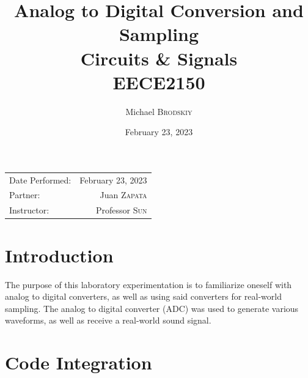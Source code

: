 \documentclass[
	letterpaper, %
	10pt, %
]{CSUniSchoolLabReport}
\title{Analog to Digital Conversion and Sampling \\ Circuits \& Signals \\ EECE2150} %
\author{Michael \textsc{Brodskiy}}
\date{February 23, 2023} %
\begin{document}
\maketitle %

\begin{center}
	\begin{tabular}{l r}
		Date Performed: & February 23, 2023 \\ %
        Partner: & Juan \textsc{Zapata} \\ %
		Instructor: & Professor \textsc{Sun} %
	\end{tabular}
\end{center}

\setcounter{section}{-1}

\section{Introduction}

The purpose of this laboratory experimentation is to familiarize oneself with analog to digital converters, as well as using said converters for real-world sampling. The analog to digital converter (ADC) was used to generate various waveforms, as well as receive a real-world sound signal.

\section{Code Integration}


\end{document}
